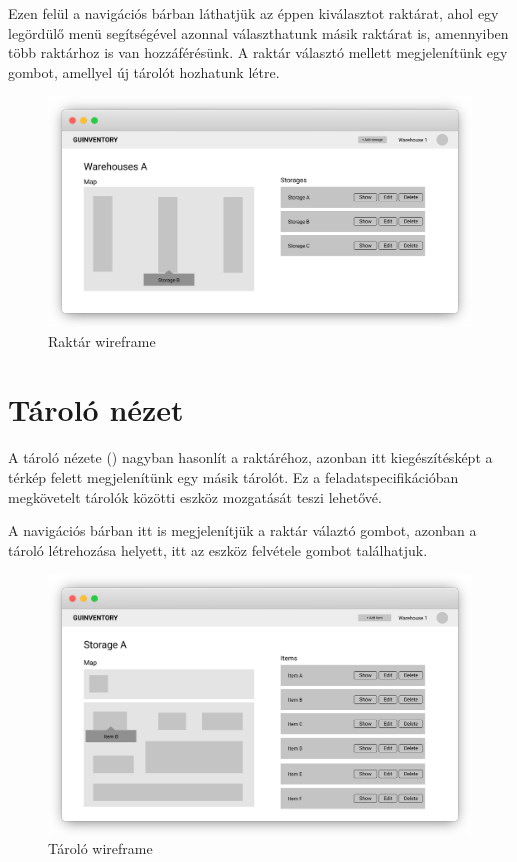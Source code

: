 Ezen felül a navigációs bárban láthatjük az éppen kiválasztot raktárat, ahol egy legördülő menü segítségével azonnal választhatunk másik raktárat is, amennyiben több raktárhoz is van hozzáférésünk.
A raktár választó mellett megjelenítünk egy gombot, amellyel új tárolót hozhatunk létre.
\begin{figure}[!ht]
  \centering
  \includegraphics[width=150mm, keepaspectratio]{figures/wireframes/frame_warehouse.png}
  \caption{Raktár wireframe}
  \label{fig:WarehouseWireframe}
\end{figure}

\section{Tároló nézet}
A tároló nézete () nagyban hasonlít a raktáréhoz, azonban itt kiegészítésképt a térkép felett megjelenítünk egy másik tárolót.
Ez a feladatspecifikációban megkövetelt tárolók közötti eszköz mozgatását teszi lehetővé.

A navigációs bárban itt is megjelenítjük a raktár válaztó gombot, azonban a tároló létrehozása helyett, itt az eszköz felvétele gombot találhatjuk.

\begin{figure}[!ht]
  \centering
  \includegraphics[width=150mm, keepaspectratio]{figures/wireframes/frame_storage.png}
  \caption{Tároló wireframe}
  \label{fig:StorageWireframe}
\end{figure}
  